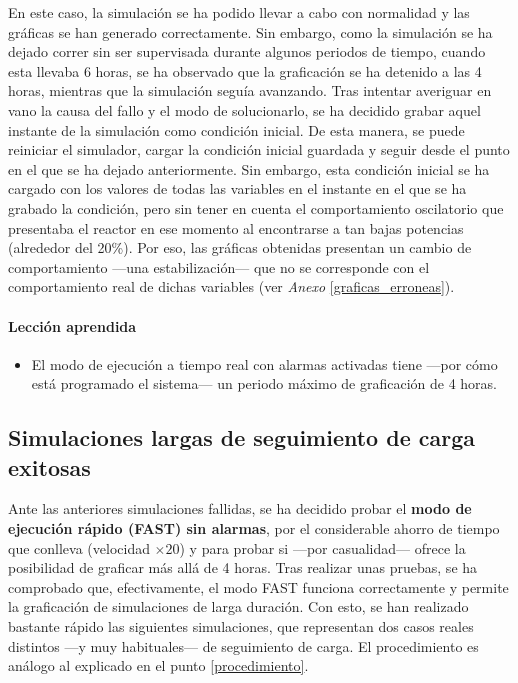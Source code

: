 En este caso, la simulación se ha podido llevar a cabo con normalidad y las gráficas se han generado correctamente. Sin embargo, como la simulación se ha dejado correr sin ser supervisada durante algunos periodos de tiempo, cuando esta llevaba 6 horas, se ha observado que la graficación se ha detenido a las 4 horas, mientras que la simulación seguía avanzando. Tras intentar averiguar en vano la causa del fallo y el modo de solucionarlo, se ha decidido grabar aquel instante de la simulación como condición inicial. De esta manera, se puede reiniciar el simulador, cargar la condición inicial guardada y seguir desde el punto en el que se ha dejado anteriormente. Sin embargo, esta condición inicial se ha cargado con los valores de todas las variables en el instante en el que se ha grabado la condición, pero sin tener en cuenta el comportamiento oscilatorio que presentaba el reactor en ese momento al encontrarse a tan bajas potencias (alrededor del 20\%). Por eso, las gráficas obtenidas presentan un cambio de comportamiento ---una estabilización--- que no se corresponde con el comportamiento real de dichas variables (ver \textit{Anexo} \ref{graficas_erroneas}).

\paragraph{Lección aprendida}

\begin{itemize}
  \item El modo de ejecución a tiempo real con alarmas activadas tiene ---por cómo está programado el sistema--- un periodo máximo de graficación de 4 horas. 
\end{itemize}

\newpage
\subsection{Simulaciones largas de seguimiento de carga exitosas}

Ante las anteriores simulaciones fallidas, se ha decidido probar el \textbf{modo de ejecución rápido (FAST) sin alarmas}, por el considerable ahorro de tiempo que conlleva (velocidad $\times 20$) y para probar si ---por casualidad--- ofrece la posibilidad de graficar más allá de 4 horas. Tras realizar unas pruebas, se ha comprobado que, efectivamente, el modo FAST funciona correctamente y permite la graficación de simulaciones de larga duración. Con esto, se han realizado bastante rápido las siguientes simulaciones, que representan dos casos reales distintos ---y muy habituales--- de seguimiento de carga. El procedimiento es análogo al explicado en el punto \ref{procedimiento}.

